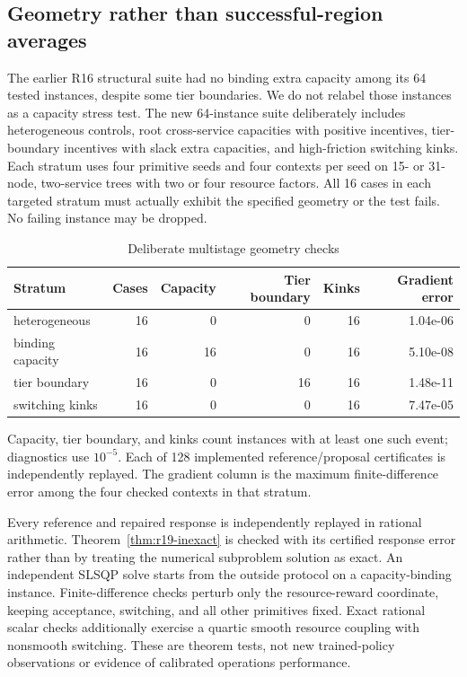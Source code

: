 \documentclass[11pt,letterpaper]{article}
\theoremstyle{definition}
\newcommand{\1}{\mathbf 1}
\begin{document}
\subsection{Geometry rather than successful-region averages}
The earlier R16 structural suite had no binding extra capacity among its 64 tested instances, despite some tier boundaries. We do not relabel those instances as a capacity stress test. The new 64-instance suite deliberately includes heterogeneous controls, root cross-service capacities with positive incentives, tier-boundary incentives with slack extra capacities, and high-friction switching kinks. Each stratum uses four primitive seeds and four contexts per seed on 15- or 31-node, two-service trees with two or four resource factors. All 16 cases in each targeted stratum must actually exhibit the specified geometry or the test fails. No failing instance may be dropped.

\begin{table}[p]
\centering
\caption{Deliberate multistage geometry checks}\label{tab:r19-geometry}
\setlength{\tabcolsep}{4pt}
\begin{tabular}{lrrrrr}
\toprule
Stratum & Cases & Capacity & Tier boundary & Kinks & Gradient error \\
\midrule
heterogeneous & 16 & 0 & 0 & 16 & 1.04e-06 \\
binding capacity & 16 & 16 & 0 & 16 & 5.10e-08 \\
tier boundary & 16 & 0 & 16 & 16 & 1.48e-11 \\
switching kinks & 16 & 0 & 0 & 16 & 7.47e-05 \\
\bottomrule
\end{tabular}

\par\medskip\begin{minipage}{\textwidth}Capacity, tier boundary, and kinks count instances with at least one such event; diagnostics use $10^{-5}$. Each of 128 implemented reference/proposal certificates is independently replayed. The gradient column is the maximum finite-difference error among the four checked contexts in that stratum.\end{minipage}
\end{table}

Every reference and repaired response is independently replayed in rational arithmetic. Theorem~\ref{thm:r19-inexact} is checked with its certified response error rather than by treating the numerical subproblem solution as exact. An independent SLSQP solve starts from the outside protocol on a capacity-binding instance. Finite-difference checks perturb only the resource-reward coordinate, keeping acceptance, switching, and all other primitives fixed. Exact rational scalar checks additionally exercise a quartic smooth resource coupling with nonsmooth switching. These are theorem tests, not new trained-policy observations or evidence of calibrated operations performance.
\end{document}
